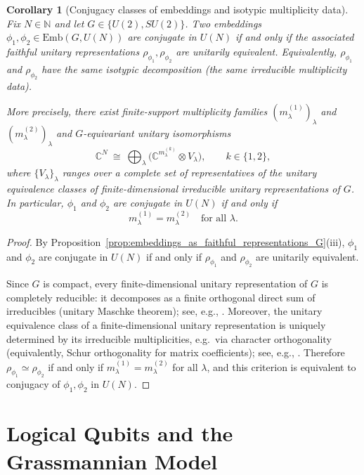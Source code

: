 \documentclass{article}%
\newtheorem{corollary}[theorem]{Corollary}
\theoremstyle{definition}
\numberwithin{equation}{section}
\newcommand{\C}{\mathbb{C}}
\newcommand{\Emb}{\mathrm{Emb}}
\begin{document}
\begin{corollary}[Conjugacy classes of embeddings and isotypic multiplicity data]
\label{cor:conjugacy_isotypic_data_G}
Fix $N\in\mathbb{N}$ and let $G\in\{U(2),SU(2)\}$. Two embeddings $\phi_1,\phi_2\in \Emb(G,U(N))$ are
conjugate in $U(N)$ if and only if the associated faithful unitary representations $\rho_{\phi_1},
\rho_{\phi_2}$ are unitarily equivalent. Equivalently, $\rho_{\phi_1}$ and $\rho_{\phi_2}$ have the
same isotypic decomposition (the same irreducible multiplicity data).

More precisely, there exist finite-support multiplicity families $(m_\lambda^{(1)})_\lambda$ and
$(m_\lambda^{(2)})_\lambda$ and $G$-equivariant unitary isomorphisms
\[
\C^N \ \cong\ \bigoplus_{\lambda}\Big(\C^{m_\lambda^{(k)}}\otimes V_\lambda\Big),
\qquad k\in\{1,2\},
\]
where $\{V_\lambda\}_\lambda$ ranges over a complete set of representatives of the unitary
equivalence classes of finite-dimensional irreducible unitary representations of $G$. In
particular, $\phi_1$ and $\phi_2$ are conjugate in $U(N)$ if and only if
\[
m_\lambda^{(1)}=m_\lambda^{(2)} \quad \text{for all }\lambda.
\]
\end{corollary}

\begin{proof}
By Proposition~\ref{prop:embeddings_as_faithful_representations_G}(iii), $\phi_1$ and $\phi_2$ are
conjugate in $U(N)$ if and only if $\rho_{\phi_1}$ and $\rho_{\phi_2}$ are unitarily equivalent.

Since $G$ is compact, every finite-dimensional unitary representation of $G$ is completely reducible:
it decomposes as a finite orthogonal direct sum of irreducibles (unitary Maschke theorem); see,
e.g., \cite{BrockerDieck1985,Hall2015,Knapp2002}. Moreover, the unitary equivalence class of a
finite-dimensional unitary representation is uniquely determined by its irreducible multiplicities,
e.g.\ via character orthogonality (equivalently, Schur orthogonality for matrix coefficients); see,
e.g., \cite{BrockerDieck1985,Hall2015}. Therefore $\rho_{\phi_1}\simeq \rho_{\phi_2}$ if and only if
$m_\lambda^{(1)}=m_\lambda^{(2)}$ for all $\lambda$, and this criterion is equivalent to conjugacy of
$\phi_1,\phi_2$ in $U(N)$.
\end{proof}


\section{Logical Qubits and the Grassmannian Model}
\label{sec:logical_qubits}
\end{document}
